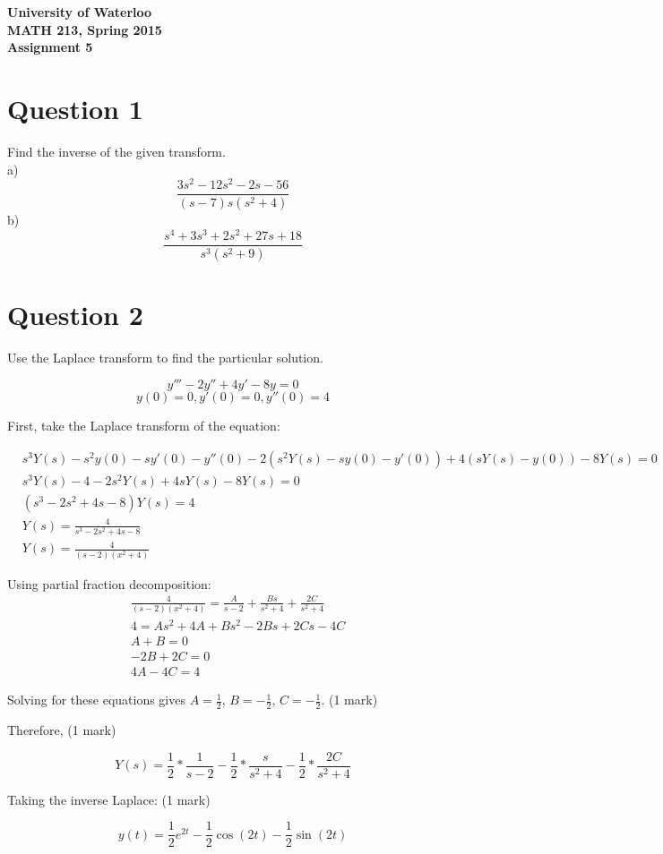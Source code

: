\documentclass[12pt]{article}
\begin{document}
\begin{center}
{\Large\bf University of Waterloo}\\
\vspace{3mm}
{\Large\bf MATH 213, Spring 2015}\\
\vspace{2mm}
{\Large\bf Assignment 5}\\
\end{center}

\section*{Question 1}

Find the inverse of the given transform. \\

\noindent
a) $$\frac{3s^2 - 12s^2 - 2s - 56}{(s-7)s(s^2+4)}$$
b) $$\frac{s^4 + 3s^3 + 2s^2 + 27s + 18}{s^3(s^2+9)}$$

\section*{Question 2}

Use the Laplace transform to find the particular solution.

$$y''' - 2y'' + 4y' - 8y = 0$$
$$y(0) = 0, y'(0) = 0, y''(0) = 4$$

\noindent First, take the Laplace transform of the equation:

\begin{align*}
  &s^3Y(s) - s^2y(0) - sy'(0) - y''(0) - 2(s^2Y(s) - sy(0) - y'(0)) + 4(sY(s) - y(0)) - 8Y(s) = 0
  \\ &s^3Y(s) - 4 - 2s^2Y(s) + 4sY(s) - 8Y(s) = 0
  \\ &(s^3 - 2s^2 + 4s - 8)Y(s) = 4
  \\ &Y(s) = \frac{4}{s^3 - 2s^2 + 4s - 8}
  \\ &Y(s) = \frac{4}{(s-2)(x^2 + 4)} \tag{1 mark}
\end{align*}

\noindent Using partial fraction decomposition:
\begin{align*}
  &\frac{4}{(s-2)(x^2 + 4)} = \frac{A}{s-2} + \frac{Bs}{s^2 + 4} + \frac{2C}{s^2 + 4}
  \\ &4 = As^2 + 4A + Bs^2 - 2Bs + 2Cs - 4C
  \\ &A + B = 0
  \\ &-2B + 2C = 0
  \\ &4A - 4C = 4 \tag{1 mark}
\end{align*}

\noindent Solving for these equations gives $A = \frac{1}{2}$, $B = -\frac{1}{2}$, $C = -\frac{1}{2}$. (1 mark)

\noindent Therefore, (1 mark)

$$Y(s) = \frac{1}{2}*\frac{1}{s-2} - \frac{1}{2}*\frac{s}{s^2 + 4} - \frac{1}{2}*\frac{2C}{s^2 + 4}$$

\noindent Taking the inverse Laplace: (1 mark)

$$y(t) = \frac{1}{2}e^{2t} - \frac{1}{2}\cos(2t) - \frac{1}{2}\sin(2t)$$
\end{document}
